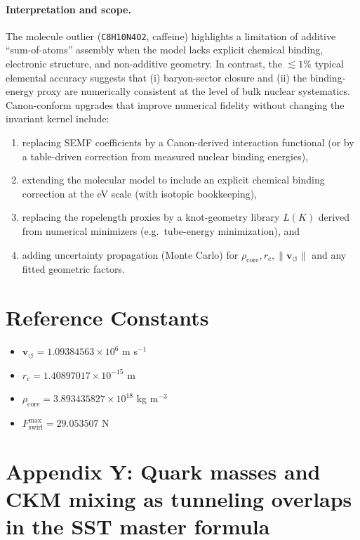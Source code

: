 \documentclass[10pt]{article}
\newcommand{\rhocore}{\rho_{\text{core}}}
\begin{document}
\paragraph{Interpretation and scope.}
The molecule outlier (\texttt{C8H10N4O2}, caffeine) highlights a limitation of additive ``sum-of-atoms'' assembly when the model lacks explicit chemical binding, electronic structure, and non-additive geometry. In contrast, the \(\lesssim 1\%\) typical elemental accuracy suggests that (i) baryon-sector closure and (ii) the binding-energy proxy are numerically consistent at the level of bulk nuclear systematics. Canon-conform upgrades that improve numerical fidelity without changing the invariant kernel include:
\begin{enumerate}
    \item replacing SEMF coefficients by a Canon-derived interaction functional (or by a table-driven correction from measured nuclear binding energies),
    \item extending the molecular model to include an explicit chemical binding correction at the eV scale (with isotopic bookkeeping),
    \item replacing the ropelength proxies by a knot-geometry library \(L(K)\) derived from numerical minimizers (e.g.\ tube-energy minimization), and
    \item adding uncertainty propagation (Monte Carlo) for \(\rho_{\text{core}}, r_c,\lVert \mathbf{v}_{\!\boldsymbol{\circlearrowleft}}\rVert\) and any fitted geometric factors.
\end{enumerate}

    \section{Reference Constants}
    \begin{itemize}
        \item $\mathbf{v}_{\circlearrowleft} = 1.09384563 \times 10^6$ m s$^{-1}$
        \item $r_c = 1.40897017 \times 10^{-15}$ m
        \item $\rhocore = 3.893435827 \times 10^{18}$ kg m$^{-3}$
        \item $F_{\text{swirl}}^{\max} = 29.053507$ N
    \end{itemize}

    \section*{Appendix Y: Quark masses and CKM mixing as tunneling overlaps in the SST master formula}
\end{document}
